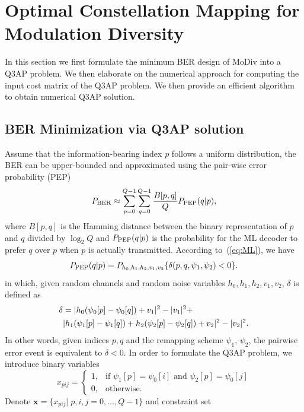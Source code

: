 \documentclass[journal]{IEEEtran}
\newcommand{\PEP}{\rm{PEP}}
\newcommand{\BER}{\rm{BER}}
\begin{document}
\section{Optimal Constellation Mapping for Modulation Diversity}
\label{sec:core}
In this section we first formulate the minimum BER design of MoDiv into a Q3AP
problem. We then elaborate on the numerical approach for computing the input
cost matrix of the Q3AP problem. We then provide an efficient algorithm to
obtain numerical Q3AP solution.

\subsection{BER Minimization via Q3AP solution}
Assume that the information-bearing index $p$ follows a uniform distribution,
the BER can be upper-bounded and approximated using the pair-wise error
probability (PEP)~\cite{harvind2005symbol}
\begin{align}
    P_{\BER} \approx \sum_{p=0}^{Q - 1}\sum_{q=0}^{Q - 1}\frac{B[p,
    q]}{Q}P_{\PEP}(q | p), \label{eq:P_BER}
\end{align}
where $B[p,q]$ is the Hamming distance between the binary representation of $p$
and $q$ divided by $\log_2Q$ and $P_{\PEP}(q | p)$ is the probability for the ML
decoder to prefer $q$ over $p$ when $p$ is actually transmitted. According
to~(\ref{eq:ML}), we have
\begin{align}
    P_{\PEP}(q | p) = P_{h_0,h_1,h_2,v_1,v_2}\{\delta(p,q,\psi_1,\psi_2) < 0\}.
    \label{eq:P_PEP}
\end{align}
in which, given random channels and random noise variables 
$h_0,h_1,h_2,v_1,v_2$, $\delta$ is defined as
\begin{align}
    \delta & = |h_0(\psi_0[p] - \psi_0[q]) + v_1|^2 - |v_1|^2 +\notag\\ 
    &
    |h_1(\psi_1[p] - \psi_1[q])+h_2(\psi_2[p] - \psi_2[q])+v_2|^2 -
    |v_2|^2.
    \label{eq:delta}
\end{align}
In other words, given indices $p, q$ and the remapping scheme $\psi_1$,
$\psi_2$, the pairwise error event is equivalent to $\delta<0$. In order to
formulate the Q3AP problem, we introduce binary variables
\[
    x_{pij}= \left\{\begin{array}{ll}
        1,& \mbox{if $\psi_1[p] = \psi_0[i]$ and $\psi_2[p] = \psi_0[j]$}\\
        0,& \mbox{otherwise.} 
   \end{array} \right.
 \]
Denote $\mathbf{x} = \{x_{pij}|\;p,i,j=0,\ldots,Q-1\}$ and constraint set
\end{document}
